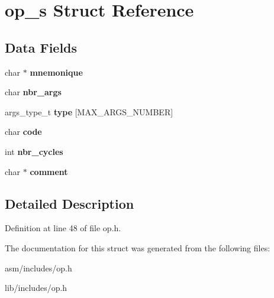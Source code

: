 \hypertarget{structop__s}{\section{op\-\_\-s Struct Reference}
\label{structop__s}
}
\subsection*{Data Fields}
\begin{DoxyCompactItemize}
\item 
\hypertarget{structop__s_a7c74c425a1570e8cc0d81d12e76e9cd0}{char $\ast$ {\bfseries mnemonique}}\label{structop__s_a7c74c425a1570e8cc0d81d12e76e9cd0}

\item 
\hypertarget{structop__s_aca9388e05ed27c0837deb9e4320a3bb3}{char {\bfseries nbr\-\_\-args}}\label{structop__s_aca9388e05ed27c0837deb9e4320a3bb3}

\item 
\hypertarget{structop__s_a6dc764e0964d9cce85e31f8bde75a2fa}{args\-\_\-type\-\_\-t {\bfseries type} \mbox{[}M\-A\-X\-\_\-\-A\-R\-G\-S\-\_\-\-N\-U\-M\-B\-E\-R\mbox{]}}\label{structop__s_a6dc764e0964d9cce85e31f8bde75a2fa}

\item 
\hypertarget{structop__s_a29e1fac89cdd53c25682b8470ec6bcda}{char {\bfseries code}}\label{structop__s_a29e1fac89cdd53c25682b8470ec6bcda}

\item 
\hypertarget{structop__s_a0b18918052dbe752738c906b8c285cfb}{int {\bfseries nbr\-\_\-cycles}}\label{structop__s_a0b18918052dbe752738c906b8c285cfb}

\item 
\hypertarget{structop__s_a25b5fde300ae928d35021696eb0aa371}{char $\ast$ {\bfseries comment}}\label{structop__s_a25b5fde300ae928d35021696eb0aa371}

\end{DoxyCompactItemize}


\subsection{Detailed Description}


Definition at line 48 of file op.\-h.



The documentation for this struct was generated from the following files\-:\begin{DoxyCompactItemize}
\item 
asm/includes/op.\-h\item 
lib/includes/op.\-h\end{DoxyCompactItemize}

